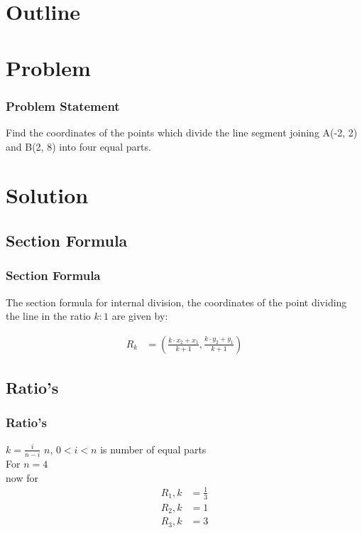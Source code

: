 \documentclass{beamer}
\author{Ankit Jainar \\EE24BTECH11004\\IIT Hyderabad.}
\date{\today}
\theoremstyle{remark}
\numberwithin{equation}{section}
\begin{document}
\begin{frame}
\titlepage
\end{frame}

\section*{Outline}
\begin{frame}
\tableofcontents
\end{frame}
\section{Problem}
\begin{frame}
\frametitle{Problem Statement}

Find the coordinates of the points which divide the line segment joining A(-2, 2) and B(2, 8) into four equal parts.

\end{frame}

\section{Solution}
\subsection{Section Formula}
\begin{frame}
\frametitle{Section Formula}

The section formula for internal division, the coordinates of the point dividing the line in the ratio $k:1$ are given by:

\begin{align}
R_k &= \left( \frac{k \cdot x_2  +  x_1}{k+1}, \frac{k \cdot y_2 +  y_1}{k+1} \right)
\end{align}

\end{frame}
\subsection{Ratio's}
\begin{frame}
\frametitle{Ratio's}
$k = \frac{i}{n-i}$ $n$, $0<i<n$ is number of equal parts \\
For $n = 4$ \\
now for
\begin{align}
R_1,k&=\frac{1}{3}\\
R_2,k&=1\\
R_3,k&=3
\end{align}
\end{frame}
\end{document}
